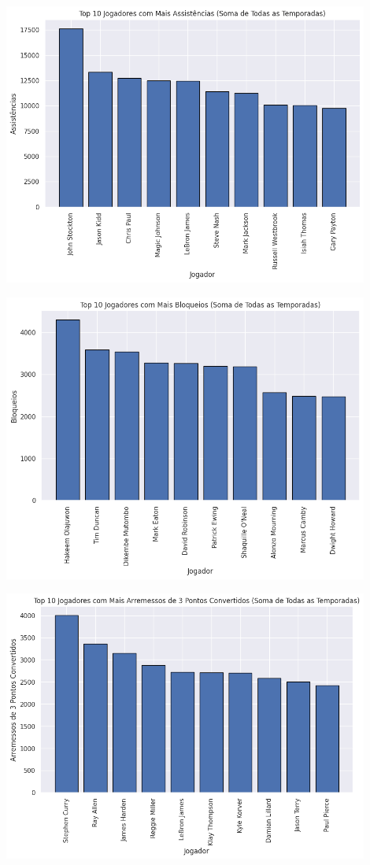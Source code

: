 \documentclass[
]{book}
\begin{document}
\includegraphics[width=0.9\textwidth,height=\textheight]{imagens/17.png}

\includegraphics[width=0.9\textwidth,height=\textheight]{imagens/18.png}

\includegraphics[width=0.9\textwidth,height=\textheight]{imagens/19.png}
\end{document}
